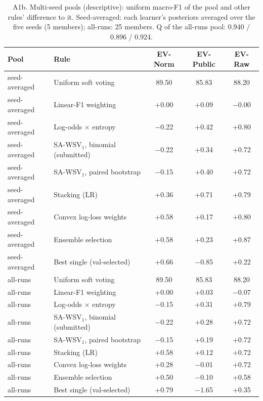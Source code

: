 \begin{table}[!htbp]\centering\scriptsize
\caption*{A1b. Multi-seed pools (descriptive): uniform macro-F1 of the pool and other rules' difference to it. Seed-averaged: each learner's posteriors averaged over the five seeds (5 members); all-runs: 25 members. Q of the all-runs pool: 0.940 / 0.896 / 0.924.}
\begin{tabular}{llccc}\toprule
Pool & Rule & EV-Norm & EV-Public & EV-Raw \\ \midrule
seed-averaged & Uniform soft voting & 89.50 & 85.83 & 88.20 \\
seed-averaged & Linear-F1 weighting & +0.00 & +0.09 & $-$0.00 \\
seed-averaged & Log-odds $\times$ entropy & $-$0.22 & +0.42 & +0.80 \\
seed-averaged & SA-WSV$_1$, binomial (submitted) & $-$0.22 & +0.34 & +0.72 \\
seed-averaged & SA-WSV$_1$, paired bootstrap & $-$0.15 & +0.40 & +0.72 \\
seed-averaged & Stacking (LR) & +0.36 & +0.71 & +0.79 \\
seed-averaged & Convex log-loss weights & +0.58 & +0.17 & +0.80 \\
seed-averaged & Ensemble selection & +0.58 & +0.23 & +0.87 \\
seed-averaged & Best single (val-selected) & +0.66 & $-$0.85 & +0.22 \\
all-runs & Uniform soft voting & 89.50 & 85.83 & 88.20 \\
all-runs & Linear-F1 weighting & +0.00 & +0.03 & $-$0.07 \\
all-runs & Log-odds $\times$ entropy & $-$0.15 & +0.31 & +0.79 \\
all-runs & SA-WSV$_1$, binomial (submitted) & $-$0.22 & +0.28 & +0.72 \\
all-runs & SA-WSV$_1$, paired bootstrap & $-$0.15 & +0.19 & +0.72 \\
all-runs & Stacking (LR) & +0.58 & +0.12 & +0.72 \\
all-runs & Convex log-loss weights & +0.28 & $-$0.01 & +0.72 \\
all-runs & Ensemble selection & +0.50 & $-$0.10 & +0.58 \\
all-runs & Best single (val-selected) & +0.79 & $-$1.65 & +0.35 \\
\bottomrule\end{tabular}\end{table}

